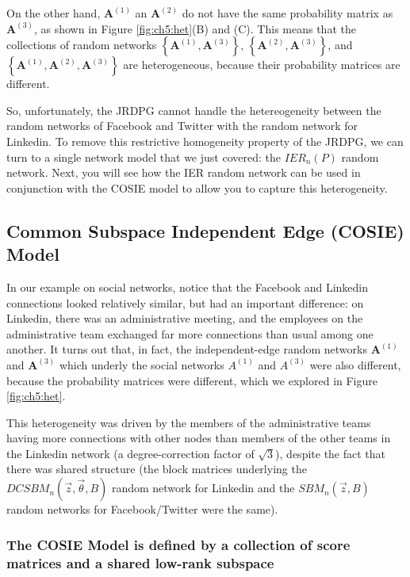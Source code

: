 On the other hand, $\mathbf A^{(1)}$ an $\mathbf A^{(2)}$ do not have the same probability matrix as $\mathbf A^{(3)}$, as shown in Figure \ref{fig:ch5:het}(B) and (C). This means that the collections of random networks $\left\{\mathbf A^{(1)}, \mathbf A^{(3)}\right\}$, $\left\{\mathbf A^{(2)}, \mathbf A^{(3)}\right\}$, and $\left\{\mathbf A^{(1)}, \mathbf A^{(2)}, \mathbf A^{(3)}\right\}$ are {heterogeneous}, because their probability matrices are different. 

So, unfortunately, the JRDPG cannot handle the hetereogeneity between the random networks of Facebook and Twitter with the random network for Linkedin. To remove this restrictive homogeneity property of the JRDPG, we can turn to a single network model that we just covered: the $IER_n(P)$ random network. Next, you will see how the IER random network can be used in conjunction with the COSIE model to allow you to capture this heterogeneity. 


\subsection{Common Subspace Independent Edge (COSIE) Model}
\label{sec:ch5:multi:cosie}

In our example on social networks, notice that the Facebook and Linkedin connections looked relatively similar, but had an important difference: on Linkedin, there was an administrative meeting, and the employees on the administrative team exchanged far more connections than usual among one another. It turns out that, in fact, the independent-edge random networks $\mathbf A^{(1)}$ and $\mathbf A^{(3)}$ which underly the social networks $A^{(1)}$ and $A^{(3)}$ were also different, because the probability matrices were different, which we explored in Figure \ref{fig:ch5:het}. 

This {heterogeneity} was driven by the members of the administrative teams having more connections with other nodes than members of the other teams in the Linkedin network (a degree-correction factor of $\sqrt 3$), despite the fact that there was shared structure (the block matrices underlying the $DCSBM_n(\vec z, \vec\theta, B)$ random network for Linkedin and the $SBM_n(\vec z, B)$ random networks for Facebook/Twitter were the same).

\subsubsection{The COSIE Model is defined by a collection of score matrices and a shared low-rank subspace}

